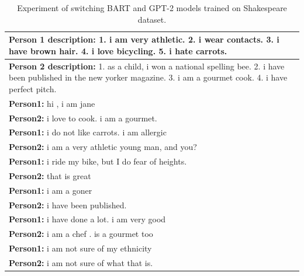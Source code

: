 \begin{table}[ht]
\centering
 \begin{tabular}{|p{14cm}|} 
 \hline
 \textbf{Person 1 description:} 1. i am very athletic. 2. i wear contacts. 3. i have brown hair. 4. i love bicycling. 5. i hate carrots. \\
 \hline
 \textbf{Person 2 description:} 1. as a child, i won a national spelling bee. 2. i have been published in the new yorker magazine. 3. i am a gourmet cook. 4. i have perfect pitch. \\
 \hline
 \textbf{Person1:} hi , i am jane  \\
 \textbf{Person2:} i love to cook. i am a gourmet. \\ 
 \textbf{Person1:} i do not like carrots. i am allergic \\
 \textbf{Person2:} i am a very athletic young man, and you?\\
 \textbf{Person1:} i ride my bike, but I do fear of heights. \\
 \textbf{Person2:} that is great \\
 \textbf{Person1:} i am a goner  \\
 \textbf{Person2:} i have been published.\\
 \textbf{Person1:} i have done a lot. i am very good  \\
 \textbf{Person2:} i am a chef . is a gourmet too \\
 \textbf{Person1:} i am not sure of my ethnicity \\
 \textbf{Person2:} i am not sure of what that is. \\
 \hline
 \end{tabular}
 \caption{Experiment of switching BART and GPT-2 models trained on Shakespeare dataset.}
\label{tab:shakespeare_switch}
\end{table}

